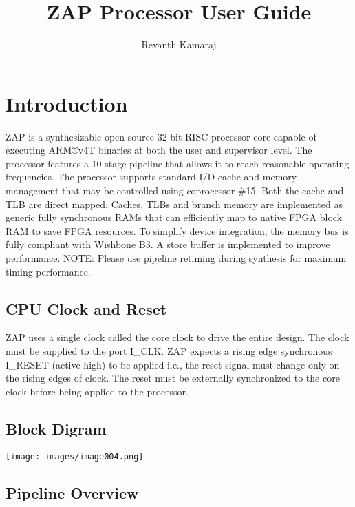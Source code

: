 \documentclass[10pt]{article}
\title{ZAP Processor User Guide}
\author{Revanth Kamaraj}
\begin{document}
\lstset{language=Perl}
\date{\vspace{-5ex}}
\maketitle

\section{Introduction}

ZAP is a synthesizable open source 32-bit RISC processor core capable of 
executing ARM®v4T binaries at both the user and supervisor level. The processor 
features a 10-stage pipeline that allows it to reach reasonable operating 
frequencies. The processor supports standard I/D cache and memory management 
that may be controlled using coprocessor \#15. Both the cache and TLB are direct 
mapped. Caches, TLBs and branch memory are implemented as generic fully 
synchronous RAMs that can efficiently map to native FPGA block RAM to save FPGA 
resources. To simplify  device integration, the memory bus is fully compliant 
with Wishbone B3. A store buffer is implemented to improve performance.
\linebreak
\linebreak
NOTE: Please use pipeline retiming during synthesis for maximum timing performance. 

\subsection{CPU Clock and Reset}
ZAP uses a single clock called the core clock to drive the entire design. The 
clock must be supplied to the port I\_CLK. ZAP expects a rising edge 
synchronous I\_RESET (active high) to be applied i.e., 
the reset signal must change only on the rising edges of clock. The reset 
must be externally synchronized to the core clock before being applied to 
the processor.

\subsection{Block Digram}
\texttt{[image: images/image004.png]}

\subsection{Pipeline Overview}
\end{document}

